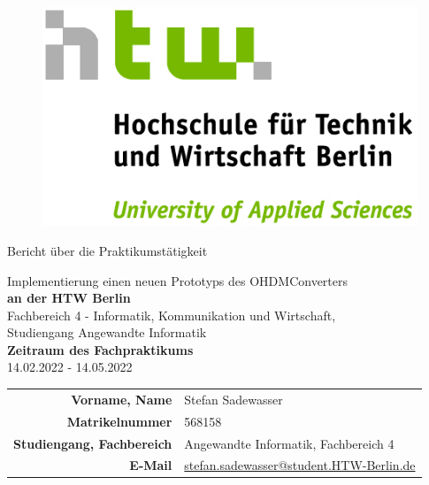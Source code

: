 \pagestyle{empty}
\clearmainofpairofpagestyles
\begin{figure}
	\centering
	\includegraphics{img/htw_logo.jpg}
	\vspace{60pt}
\end{figure}
\begin{center}
	\huge{Bericht über die Praktikumstätigkeit}\\
	\begin{large}
		Implementierung einen neuen Prototyps des OHDMConverters\\[1cm]
		\textbf{an der HTW Berlin}\\[0.4cm]
		Fachbereich 4 - Informatik, Kommunikation und Wirtschaft,\\
		Studiengang Angewandte Informatik\\[4cm]
		\textbf{Zeitraum des Fachpraktikums}\\
		14.02.2022 - 14.05.2022\\[1.5cm]
	\end{large}
	
	\begin{normalsize}
		\begin{tabularx}{\linewidth}{R X}
			\textbf{Vorname, Name} & Stefan Sadewasser\\
			\textbf{Matrikelnummer} & 568158\\
			\textbf{Studiengang, Fachbereich} & Angewandte Informatik, Fachbereich 4\\
			\textbf{E-Mail} & \href{mailto:stefan.sadewasser@student.HTW-Berlin.de}{stefan.sadewasser@student.HTW-Berlin.de}
		\end{tabularx}
	\end{normalsize}\vspace{1cm}
\end{center} 
\newpage

